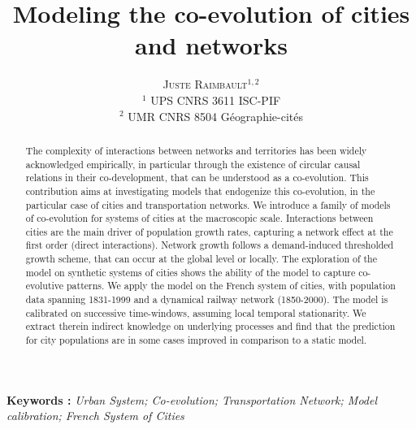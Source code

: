 \documentclass[11pt]{article}
\newcommand{\noun}[1]{\textsc{#1}}
\begin{document}
\title{Modeling the co-evolution of cities and networks}
\author{\noun{Juste Raimbault}$^{1,2}$\\
$^1$ UPS CNRS 3611 ISC-PIF\\
$^2$ UMR CNRS 8504 G{\'e}ographie-cit{\'e}s
}
\date{}


\maketitle

\justify


\begin{abstract}
The complexity of interactions between networks and territories has been widely acknowledged empirically, in particular through the existence of circular causal relations in their co-development, that can be understood as a co-evolution. This contribution aims at investigating models that endogenize this co-evolution, in the particular case of cities and transportation networks. We introduce a family of models of co-evolution for systems of cities at the macroscopic scale. Interactions between cities are the main driver of population growth rates, capturing a network effect at the first order (direct interactions). Network growth follows a demand-induced thresholded growth scheme, that can occur at the global level or locally. The exploration of the model on synthetic systems of cities shows the ability of the model to capture co-evolutive patterns. We apply the model on the French system of cities, with population data spanning 1831-1999 and a dynamical railway network (1850-2000). The model is calibrated on successive time-windows, assuming local temporal stationarity. We extract therein indirect knowledge on underlying processes and find that the prediction for city populations are in some cases improved in comparison to a static model.
\end{abstract}

\textbf{Keywords : }\textit{Urban System; Co-evolution; Transportation Network; Model calibration; French System of Cities}



%
% 
\end{document}
